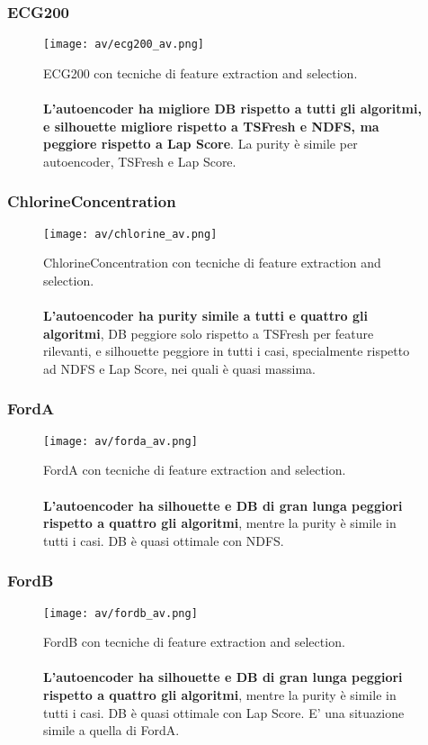 \subsubsection{ECG200}
\begin{figure}[H]
	\centering
	\texttt{[image: av/ecg200\_av.png]}
	\caption{ECG200 con tecniche di feature extraction and selection.\\
	\\
	\textbf{L'autoencoder ha migliore DB rispetto a tutti gli algoritmi, e silhouette migliore rispetto a TSFresh e NDFS, ma peggiore rispetto a Lap Score}. La purity è simile per autoencoder, TSFresh e Lap Score.}
	\label{fig:ecg200_av}
\end{figure}

\subsubsection{ChlorineConcentration}
\begin{figure}[H]
	\centering
	\texttt{[image: av/chlorine\_av.png]}
	\caption{ChlorineConcentration con tecniche di feature extraction and selection.\\
	\\
	\textbf{L'autoencoder ha purity simile a tutti e quattro gli algoritmi}, DB peggiore solo rispetto a TSFresh per feature rilevanti, e silhouette peggiore in tutti i casi, specialmente rispetto ad NDFS e Lap Score, nei quali è quasi massima.}
	\label{fig:chlorine_av}
\end{figure}

\subsubsection{FordA}
\begin{figure}[H]
	\centering
	\texttt{[image: av/forda\_av.png]}
	\caption{FordA con tecniche di feature extraction and selection.\\
	\\
	\textbf{L'autoencoder ha silhouette e DB di gran lunga peggiori rispetto a quattro gli algoritmi}, mentre la purity è simile in tutti i casi. DB è quasi ottimale con NDFS.}
	\label{fig:forda_av}
\end{figure}

\subsubsection{FordB}
\begin{figure}[H]
	\centering
	\texttt{[image: av/fordb\_av.png]}
	\caption{FordB con tecniche di feature extraction and selection.\\
	\\
	\textbf{L'autoencoder ha silhouette e DB di gran lunga peggiori rispetto a quattro gli algoritmi}, mentre la purity è simile in tutti i casi. DB è quasi ottimale con Lap Score. E' una situazione simile a quella di FordA.}
	\label{fig:fordb_av}
\end{figure}


